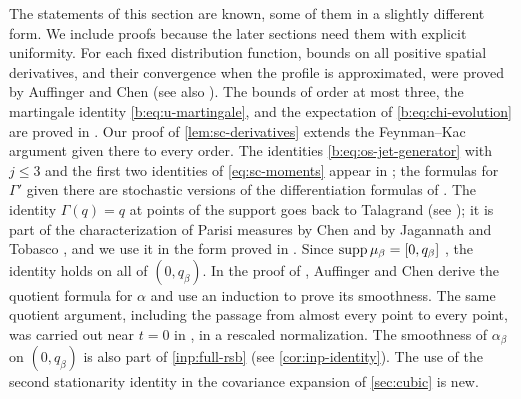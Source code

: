 The statements of this section are known, some of them in a slightly
different form. We include proofs because the later sections need them with
explicit uniformity. For each fixed distribution function, bounds on all
positive spatial derivatives, and their convergence when the profile is
approximated, were proved by Auffinger and Chen
\cite[Propositions~1--2]{auffinger-chen-2015} (see also
\cite[Proposition~2.4]{full-rsb}). The bounds of order at most three, the
martingale identity \eqref{b:eq:u-martingale}, and the expectation of
\eqref{b:eq:chi-evolution} are proved in \cite[Lemma~3.1]{oai-barriers}. Our
proof of \cref{lem:sc-derivatives} extends the Feynman--Kac argument given
there to every order. The identities \eqref{b:eq:os-jet-generator} with
$j\le3$ and the first two identities of \eqref{eq:sc-moments} appear in
\cite[Lemma~2.5, (2.12)--(2.16)]{full-rsb}; the formulas for $\Gamma'$
given there are stochastic versions of the differentiation formulas of
\cite[Proposition~3]{auffinger-chen-2015}. The identity $\Gamma(q)=q$ at
points of the support goes back to Talagrand
\cite{talagrand-2006-parisi-measures} (see
\cite[Theorem~5 and its proof]{auffinger-chen-2015}); it is part of the
characterization of Parisi measures by Chen \cite[Proposition~1]{chen-2017}
and by Jagannath and Tobasco \cite[Proposition~1.1]{jagannath-tobasco-2017},
and we use it in the form proved in \cite[Proposition~3.2]{oai-barriers}.
Since $\operatorname{supp}\mu_\beta=[0,q_\beta]$ \cite[Theorem~1.1]{full-rsb}, the identity holds on
all of $(0,q_\beta)$. In the proof
of \cite[Theorem~2(ii)]{auffinger-chen-2015}, Auffinger and Chen derive the
quotient formula for $\alpha$ and use an induction to prove its smoothness.
The same quotient argument, including the passage from almost every point
to every point, was carried out near $t=0$ in
\cite[proof of Lemma~7.2, Step~3, (7.8)--(7.12)]{quantitative-parisi}, in a
rescaled normalization. The smoothness of $\alpha_\beta$ on
$(0,q_\beta)$ is also part of \cref{inp:full-rsb} (see
\cref{cor:inp-identity}). The use of the second stationarity identity in the
covariance expansion of \cref{sec:cubic} is new.

